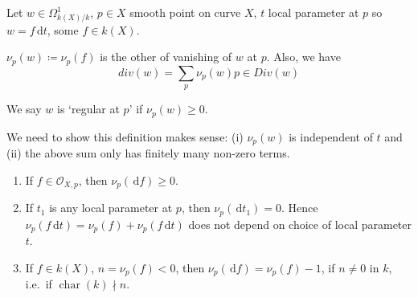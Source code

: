 \documentclass{article}
\newcommand{\diff}{\,\textrm{d}}
\DeclareMathOperator{\chara}{char}
\begin{document}
Let $w \in \Omega^1_{k(X)/k}$, $p \in X$ smooth point on curve $X$, $t$ local parameter at $p$ so $w = f \diff t$, some $f \in k(X)$.
\begin{defi}
    $\nu_p(w) \coloneqq \nu_p(f)$ is the other of vanishing of $w$ at $p$. Also, we have
    \begin{equation*}
        div(w) = \sum_p \nu_p(w) p \in Div(w)
    \end{equation*}
\end{defi}
We say $w$ is `regular at $p$' if $\nu_p(w) \geq 0$.

We need to show this definition makes sense: (i) $\nu_p(w)$ is independent of $t$ and (ii) the above sum only has finitely many non-zero terms.
\begin{lemma}
    \begin{enumerate}[label=(\alph*)]
        \item If $f \in \mathcal{O}_{X, p}$, then $\nu_p(\diff f) \geq 0$.
        \item If $t_1$ is any local parameter at $p$, then $\nu_p(\diff t_1) = 0$.
            Hence $\nu_p(f \diff t) = \nu_p(f) + \nu_p(f \diff t)$ does not depend on choice of local parameter $t$.
        \item If $f \in k(X)$, $n = \nu_p(f) < 0$, then $\nu_p(\diff f) = \nu_p(f) - 1$, if $n \neq 0$ in $k$, i.e.\ if $\chara(k) \nmid n$.
    \end{enumerate}
\end{lemma}
\end{document}
